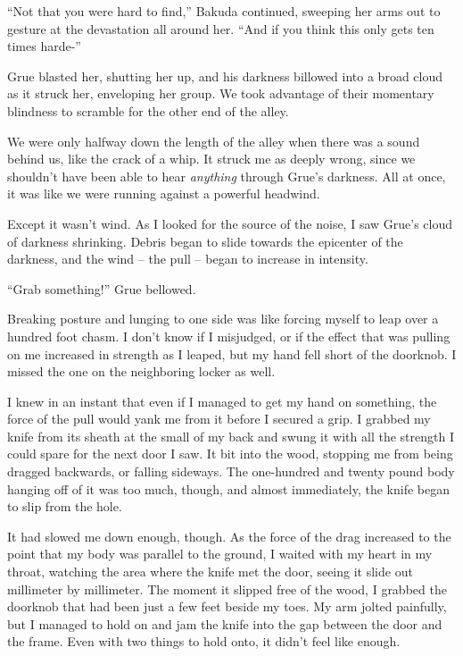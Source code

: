 ``Not that you were hard to find,'' Bakuda continued, sweeping her arms out to gesture at the devastation all around her.  ``And if you think this only gets ten times harde-''



Grue blasted her, shutting her up, and his darkness billowed into a broad cloud as it struck her, enveloping her group.  We took advantage of their momentary blindness to scramble for the other end of the alley.



We were only halfway down the length of the alley when there was a sound behind us, like the crack of a whip.  It struck me as deeply wrong, since we shouldn't have been able to hear \emph{anything} through Grue's darkness.  All at once, it was like we were running against a powerful headwind.



Except it wasn't wind.  As I looked for the source of the noise, I saw Grue's cloud of darkness shrinking.  Debris began to slide towards the epicenter of the darkness, and the wind – the pull – began to increase in intensity.



``Grab something!'' Grue bellowed.



Breaking posture and lunging to one side was like forcing myself to leap over a hundred foot chasm.  I don't know if I misjudged, or if the effect that was pulling on me increased in strength as I leaped, but my hand fell short of the doorknob.  I missed the one on the neighboring locker as well.



I knew in an instant that even if I managed to get my hand on something, the force of the pull would yank me from it before I secured a grip.  I grabbed my knife from its sheath at the small of my back and swung it with all the strength I could spare for the next door I saw.  It bit into the wood, stopping me from being dragged backwards, or falling sideways.  The one-hundred and twenty pound body hanging off of it was too much, though, and almost immediately, the knife began to slip from the hole.



It had slowed me down enough, though.  As the force of the drag increased to the point that my body was parallel to the ground, I waited with my heart in my throat, watching the area where the knife met the door, seeing it slide out millimeter by millimeter.  The moment it slipped free of the wood, I grabbed the doorknob that had been just a few feet beside my toes.  My arm jolted painfully, but I managed to hold on and jam the knife into the gap between the door and the frame.  Even with two things to hold onto, it didn't feel like enough.




